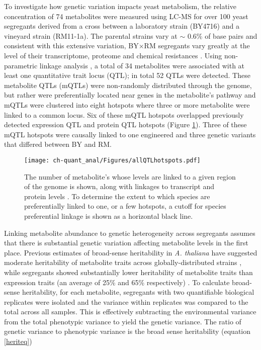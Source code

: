 To investigate how genetic variation impacts yeast metabolism, the relative concentration of 74 metabolites were measured using LC-MS for over 100 yeast segregants derived from a cross between a laboratory strain (BY4716) and a vineyard strain (RM11-1a). The parental strains vary at $\sim$ 0.6\% of base pairs and consistent with this extensive variation, BY$\times$RM segregants vary greatly at the level of their transcriptome, proteome and chemical resistances \cite{Brem:2005gh, Foss:2007ej, Bloom:2013bq}. Using non-parametric linkage analysis \cite{Broman:2003wq}, a total of 34 metabolites were associated with at least one quantitative trait locus (QTL); in total 52 QTLs were detected.  These metabolite QTLs (mQTLs) were non-randomly distributed through the genome, but rather were preferentially located near genes in the metabolite's pathway and mQTLs were clustered into eight hotspots where three or more metabolite were linked to a common locus. Six of these mQTL hotspots overlapped previously detected expression QTL and protein QTL hotspots (Figure \ref{ch-quant_anal:qtlHotspots}). Three of these mQTL hotspots were causally linked to one engineered and three genetic variants that differed between BY and RM. 

\begin{figure}[h!]
\begin{center}
\texttt{[image: ch-quant\_anal/Figures/allQTLhotspots.pdf]}
\caption[Transcript, protein and metabolite QTL linkages]{The number of metabolite's whose levels are linked to a given region of the genome is shown, along with linkages to transcript and protein levels \cite{Brem:2005gh, Foss:2007ej}. To determine the extent to which species are preferentially linked to one, or a few hotspots, a cutoff for species preferential linkage is shown as a horizontal black line.}
\label{ch-quant_anal:qtlHotspots}
\end{center}
\end{figure}


Linking metabolite abundance to genetic heterogeneity across segregants assumes that there is substantial genetic variation affecting metabolite levels in the first place.  Previous estimates of broad-sense heritability \cite{Lynch:1998vx} in \textit{A. thaliana} have suggested moderate heritability of metabolite traits across globally-distributed strains \cite{Keurentjes:2006ik}, while segregants showed substantially lower heritability of metabolite traits than expression traits (an average of 25\% and 65\% respectively) \cite{Rowe:2008ty, West:2006bk}.  To calculate broad-sense heritability, for each metabolite, segregants with two quantifiable biological replicates were isolated and the variance within replicates was compared to the total across all samples.  This is effectively subtracting the environmental variance from the total phenotypic variance to yield the genetic variance.  The ratio of genetic variance to phenotypic variance is the broad sense heritability (equation \ref{heriteq})

